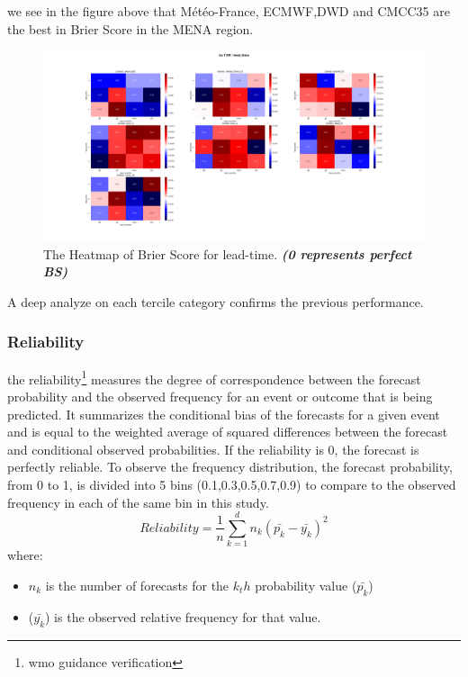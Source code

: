we see in the figure above that Météo-France, ECMWF,DWD and CMCC35 are the best in Brier Score in the MENA region.





\begin{figure}[H]
    \centering
    \includegraphics[scale=0.25]{bs_T2M_lead_time.png}
    \caption{The Heatmap of Brier Score for lead-time. \textbf{\textit{(0 represents perfect BS)}}}
\end{figure}
A deep analyze on each tercile category confirms the previous performance.



\subsubsection{Reliability}
the reliability\footnote{wmo guidance verification} measures the degree of correspondence between the forecast probability and the observed frequency for an event or outcome that is being predicted. It summarizes the conditional bias of the forecasts for a given event and is equal to the weighted average of squared differences between the forecast and conditional observed probabilities. If the reliability is 0, the forecast is perfectly reliable. To observe the frequency distribution, the forecast probability, from 0 to 1, is divided into 5 bins (0.1,0.3,0.5,0.7,0.9) to compare to the observed frequency in each of the same bin in this study. 
$$Reliability=\frac{1}{n} \sum\limits_{k=1}^{d} n_k(\bar{p_k}-\bar{y_k})^2$$
where:
\begin{itemize}
	\item $n_k$ is the number of forecasts for the $k_th$ probability value ($\bar{p_k}$)
	\item ($\bar{y_k}$) is the observed relative frequency for that value.
\end{itemize} 

